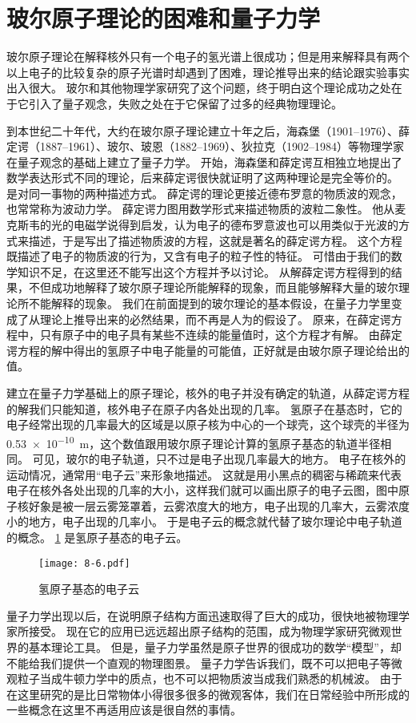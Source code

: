 \section{玻尔原子理论的困难和量子力学}
玻尔原子理论在解释核外只有一个电子的氢光谱上很成功；但是用来解释具有两个以上电子的比较复杂的原子光谱时却遇到了困难，理论推导出来的结论跟实验事实出入很大。
玻尔和其他物理学家研究了这个问题，终于明白这个理论成功之处在于它引入了量子观念，失败之处在于它保留了过多的经典物理理论。

到本世纪二十年代，大约在玻尔原子理论建立十年之后，海森堡（1901--1976）、薛定谔（1887--1961）、玻尔、玻恩（1882--1969）、狄拉克（1902--1984）等物理学家在量子观念的基础上建立了量子力学。
开始，海森堡和薛定谔互相独立地提出了数学表达形式不同的理论，后来薛定谔很快就证明了这两种理论是完全等价的。
是对同一事物的两种描述方式。
薛定谔的理论更接近德布罗意的物质波的观念，也常常称为波动力学。
薛定谔力图用数学形式来描述物质的波粒二象性。
他从麦克斯韦的光的电磁学说得到启发，认为电子的德布罗意波也可以用类似于光波的方式来描述，于是写出了描述物质波的方程，这就是著名的薛定谔方程。
这个方程既描述了电子的物质波的行为，又含有电子的粒子性的特征。
可惜由于我们的数学知识不足，在这里还不能写出这个方程并予以讨论。
从解薛定谔方程得到的结果，不但成功地解释了玻尔原子理论所能解释的现象，而且能够解释大量的玻尔理论所不能解释的现象。
我们在前面提到的玻尔理论的基本假设，在量子力学里变成了从理论上推导出来的必然结果，而不再是人为的假设了。
原来，在薛定谔方程中，只有原子中的电子具有某些不连续的能量值时，这个方程才有解。
由薛定谔方程的解中得出的氢原子中电子能量的可能值，正好就是由玻尔原子理论给出的值。

建立在量子力学基础上的原子理论，核外的电子并没有确定的轨道，从薛定谔方程的解我们只能知道，核外电子在原子内各处出现的几率。
氢原子在基态时，它的电子经常出现的几率最大的区域是以原子核为中心的一个球壳，这个球壳的半径为 \qty{0.53e-10}{m}，这个数值跟用玻尔原子理论计算的氢原子基态的轨道半径相同。
可见，玻尔的电子轨道，只不过是电子出现几率最大的地方。
电子在核外的运动情况，通常用“电子云”来形象地描述。
这就是用小黑点的稠密与稀疏来代表电子在核外各处出现的几率的大小，这样我们就可以画出原子的电子云图，图中原子核好象是被一层云雾笼罩着，云雾浓度大的地方，电子出现的几率大，云雾浓度小的地方，电子出现的几率小。
于是电子云的概念就代替了玻尔理论中电子轨道的概念。
\cref{fig:8-6} 是氢原子基态的电子云。

\begin{figure}
  \texttt{[image: 8-6.pdf]}
  \caption{氢原子基态的电子云}\label{fig:8-6}
\end{figure}

量子力学出现以后，在说明原子结构方面迅速取得了巨大的成功，很快地被物理学家所接受。
现在它的应用已远远超出原子结构的范围，成为物理学家研究微观世界的基本理论工具。
但是，量子力学虽然是原子世界的很成功的数学“模型”，却不能给我们提供一个直观的物理图景。
量子力学告诉我们，既不可以把电子等微观粒子当成牛顿力学中的质点，也不可以把物质波当成我们熟悉的机械波。
由于在这里研究的是比日常物体小得很多很多的微观客体，我们在日常经验中所形成的一些概念在这里不再适用应该是很自然的事情。

